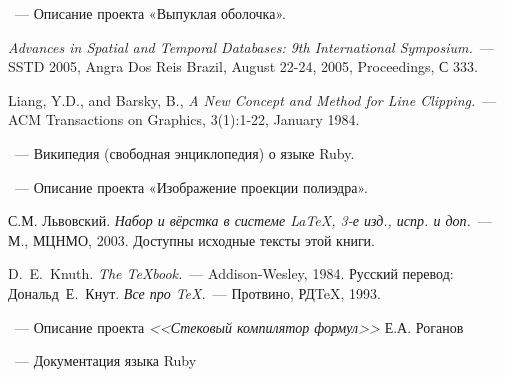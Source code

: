 \begin{thebibliography}{}

~---
Описание проекта «Выпуклая оболочка».

{\em Advances in Spatial and Temporal Databases: 9th International Symposium.}~---
SSTD 2005, Angra Dos Reis Brazil, August 22-24, 2005, Proceedings, С 333.

Liang, Y.D., and Barsky, B., {\em A New Concept and Method for Line Clipping.}~---
ACM Transactions on Graphics, 3(1):1-22, January 1984.

~---
Википедия (свободная энциклопедия) о языке Ruby.

~---
Описание проекта «Изображение проекции полиэдра».

С.М. Львовский.
{\em Набор и вёрстка в системе \LaTeX, 3-е изд., испр. и доп.}~---
М., МЦНМО, 2003. Доступны исходные тексты этой книги.

D.~E.~Knuth. {\em The \TeX{}book.}~---
Addison-Wesley, 1984. Русский перевод:
Дональд~Е.~Кнут.
{\em Все про \TeX.}~--- Протвино, РД\TeX, 1993.

~---
Описание проекта \emph{<<Стековый компилятор формул>>}
Е.А. Роганов


~---
Документация языка Ruby


\end{thebibliography}
